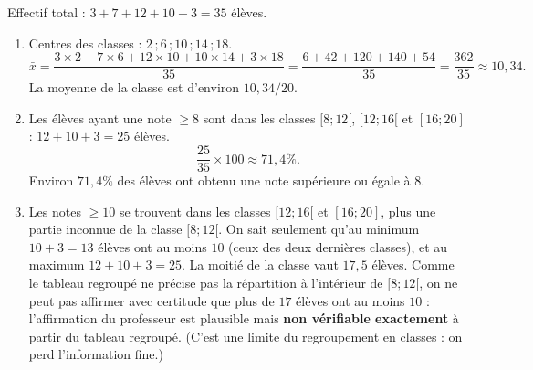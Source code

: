 \documentclass[11pt]{article}
\begin{document}
\begin{corrige}
Effectif total : $3 + 7 + 12 + 10 + 3 = 35$ élèves.
\begin{enumerate}
    \item Centres des classes : $2\,; 6\,; 10\,; 14\,; 18$.
    \[ \bar{x} = \dfrac{3 \times 2 + 7 \times 6 + 12 \times 10 + 10 \times 14 + 3 \times 18}{35} = \dfrac{6 + 42 + 120 + 140 + 54}{35} = \dfrac{362}{35} \approx 10,34. \]
    La moyenne de la classe est d'environ $10,34/20$.
    \item Les élèves ayant une note $\ge 8$ sont dans les classes $[8 ; 12[$, $[12 ; 16[$ et $[16 ; 20]$ : $12 + 10 + 3 = 25$ élèves.
    \[ \dfrac{25}{35} \times 100 \approx 71,4\%. \]
    Environ $71,4\%$ des élèves ont obtenu une note supérieure ou égale à $8$.
    \item Les notes $\ge 10$ se trouvent dans les classes $[12 ; 16[$ et $[16 ; 20]$, plus une partie inconnue de la classe $[8 ; 12[$. On sait seulement qu'au minimum $10 + 3 = 13$ élèves ont au moins $10$ (ceux des deux dernières classes), et au maximum $12 + 10 + 3 = 25$. La moitié de la classe vaut $17,5$ élèves. Comme le tableau regroupé ne précise pas la répartition à l'intérieur de $[8 ; 12[$, on ne peut pas affirmer avec certitude que plus de $17$ élèves ont au moins $10$ : l'affirmation du professeur est plausible mais \textbf{non vérifiable exactement} à partir du tableau regroupé. (C'est une limite du regroupement en classes : on perd l'information fine.)
\end{enumerate}
\end{corrige}
\end{document}
